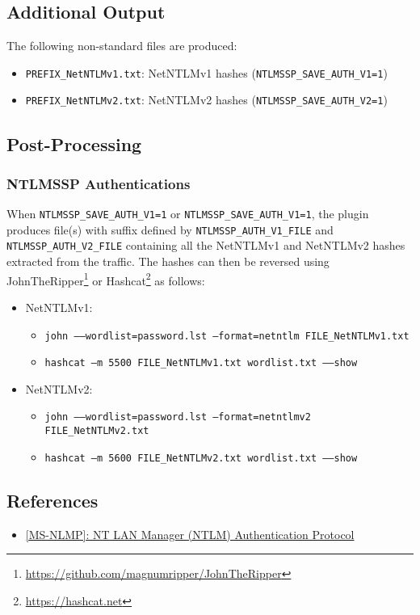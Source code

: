 \documentclass[documentation]{subfiles}
\begin{document}
\subsection{Additional Output}
The following non-standard files are produced:
\begin{itemize}
    \item {\tt PREFIX\_NetNTLMv1.txt}: NetNTLMv1 hashes ({\tt NTLMSSP\_SAVE\_AUTH\_V1=1})
    \item {\tt PREFIX\_NetNTLMv2.txt}: NetNTLMv2 hashes ({\tt NTLMSSP\_SAVE\_AUTH\_V2=1})
\end{itemize}

\clearpage

\subsection{Post-Processing}

\subsubsection{NTLMSSP Authentications}
When {\tt NTLMSSP\_SAVE\_AUTH\_V1=1} or {\tt NTLMSSP\_SAVE\_AUTH\_V1=1}, the plugin produces file(s) with suffix defined by
{\tt NTLMSSP\_AUTH\_V1\_FILE} and {\tt NTLMSSP\_AUTH\_V2\_FILE} containing all the NetNTLMv1 and NetNTLMv2 hashes extracted from the traffic.
The hashes can then be reversed using JohnTheRipper\footnote{\url{https://github.com/magnumripper/JohnTheRipper}} or Hashcat\footnote{\url{https://hashcat.net}} as follows:

\begin{itemize}
    \item NetNTLMv1:
        \begin{itemize}
            \item {\tt john --{}--wordlist=password.lst --format=netntlm FILE\_NetNTLMv1.txt}\\
            \item {\tt hashcat --m 5500 FILE\_NetNTLMv1.txt wordlist.txt --{}--show}
        \end{itemize}
    \item NetNTLMv2:
        \begin{itemize}
            \item {\tt john --{}--wordlist=password.lst --format=netntlmv2 FILE\_NetNTLMv2.txt}\\
            \item {\tt hashcat --m 5600 FILE\_NetNTLMv2.txt wordlist.txt --{}--show}
        \end{itemize}
\end{itemize}

\subsection{References}
\begin{itemize}
    \item \href{https://docs.microsoft.com/en-us/openspecs/windows_protocols/ms-nlmp}{[MS-NLMP]: NT LAN Manager (NTLM) Authentication Protocol}
\end{itemize}
\end{document}
